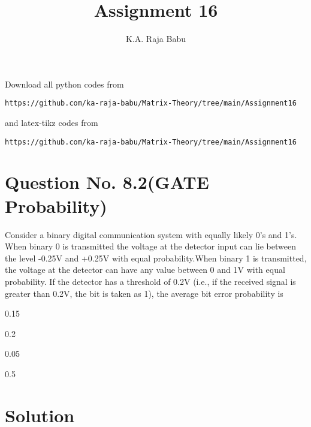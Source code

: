 \documentclass[journal,12pt,twocolumn]{IEEEtran}
\begin{document}
\makeatother
\let\StandardTheFigure\thefigure
\let\vec\mathbf
\renewcommand{\thefigure}{\theproblem}
\def\putbox#1#2#3{\makebox[0in][l]{\makebox[#1][l]{}\raisebox{\baselineskip}[0in][0in]{\raisebox{#2}[0in][0in]{#3}}}}
     \def\rightbox#1{\makebox[0in][r]{#1}}
     \def\centbox#1{\makebox[0in]{#1}}
     \def\topbox#1{\raisebox{-\baselineskip}[0in][0in]{#1}}
     \def\midbox#1{\raisebox{-0.5\baselineskip}[0in][0in]{#1}}
\vspace{3cm}
\title{Assignment 16}
\author{K.A. Raja Babu}
\maketitle
\newpage
\bigskip
\renewcommand{\thefigure}{\theenumi}
\renewcommand{\thetable}{\theenumi}
Download all python codes from 
\begin{lstlisting}
https://github.com/ka-raja-babu/Matrix-Theory/tree/main/Assignment16
\end{lstlisting}
%
and latex-tikz codes from 
%
\begin{lstlisting}
https://github.com/ka-raja-babu/Matrix-Theory/tree/main/Assignment16
\end{lstlisting}
%
\section{Question No. 8.2(GATE Probability)}

Consider a binary digital communication system with equally likely 0’s and 1’s. When binary 0 is transmitted the voltage at the detector input can lie between the level -0.25V and +0.25V with equal probability.When binary 1 is transmitted, the voltage at the detector can have any value between 0 and 1V with equal probability. If the detector has a threshold of 0.2V (i.e., if the received signal is greater than 0.2V, the bit is taken as 1), the average bit error probability is

\begin{enumerate}
\begin{multicols}{4}
\setlength\itemsep{2em}
\item 0.15
\item 0.2
\item 0.05
\item 0.5
\end{multicols}
\end{enumerate}

\section{Solution}
\end{document}
